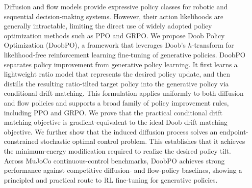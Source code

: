 Diffusion and flow models provide expressive policy classes for robotic and sequential decision-making systems.
However, their action likelihoods are generally intractable, limiting the direct use of widely adopted policy optimization methods such as PPO and GRPO. We propose Doob Policy Optimization (DoobPO), a framework that leverages  Doob's $h$-transform for likelihood-free reinforcement learning fine-tuning of generative policies. DoobPO separates policy improvement from generative policy learning. It first learns a lightweight ratio model that represents the desired policy update, and then distills the resulting ratio-tilted target policy into the generative policy via conditional drift matching. This formulation applies uniformly to both diffusion and flow policies and supports a broad family of policy improvement rules, including PPO and GRPO. 
We prove that the practical conditional drift matching objective is gradient-equivalent to the ideal Doob drift matching objective. 
We further show that the induced diffusion process solves an endpoint-constrained stochastic optimal control problem. This establishes that it achieves the minimum-energy modification required to realize the desired policy tilt.
Across MuJoCo continuous-control benchmarks, DoobPO achieves strong performance against competitive diffusion- and flow-policy baselines,  showing a principled and practical route to RL fine-tuning for generative policies.